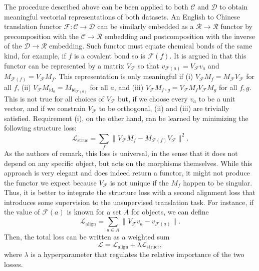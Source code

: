 \documentclass[11pt,a4paper,openright,twoside]{report}
\theoremstyle{plain}
\theoremstyle{definition}
\begin{document}
The procedure described above can be been applied to both $\mathcal{C}$ and $\mathcal{D}$ to obtain meaningful vectorial representations of both datasets. An English to Chinese translation functor $\mathcal{F}: \mathcal{C} \to \mathcal{D}$ can be similarly embedded as a $\mathcal{R} \to \mathcal{R}$ functor by precomposition with the $\mathcal{C} \to \mathcal{R}$ embedding and postcomposition with the inverse of the $\mathcal{D} \to \mathcal{R}$ embedding. Such functor must equate chemical bonds of the same kind, for example, if $f$ is a covalent bond so is $\mathcal{F}(f)$. It is argued in \cite{sheshmani2021categorical} that this functor can be represented by a matrix $V_\mathcal{F}$ so that $v_{\mathcal{F}(a)} =  V_\mathcal{F}v_a$ and $M_{\mathcal{F}(f)} = V_\mathcal{F}M_f$. This representation is only meaningful if (i) $V_{\mathcal{F}}M_f = M_{\mathcal{F}}V_{\mathcal{F}}$ for all $f$, (ii) $V_{\mathcal{F}}M_{\mathrm{id}_a} = M_{\mathrm{id}_{\mathcal{F}(a)}}$ for all $a$, and (iii) $V_{\mathcal{F}}M_{f \circ g} = V_{\mathcal{F}}M_fV_{\mathcal{F}}M_g$ for all $f,g$. This is not true for all choices of  $V_\mathcal{F}$ but, if we choose every $v_a$ to be a unit vector, and if we constrain $V_{\mathcal{F}}$ to be orthogonal, (ii) and (iii) are trivially satisfied. Requirement (i), on the other hand, can be learned by minimizing the following structure loss:
\[\mathcal{L}_{\mathrm{struc}} = \sum_{f}\|V_{\mathcal{F}}M_f - M_{\mathcal{F}(f)}V_{\mathcal{F}}\|^2.\]
As the authors of \cite{sheshmani2021categorical} remark, this loss is universal, in the sense that it does not depend on any specific object, but acts on the morphisms themselves. While this approach is very elegant and does indeed return a functor, it might not produce the functor we expect because $V_{\mathcal{F}}$ is not unique if the $M_f$ happen to be singular. Thus, it is better to integrate the structure loss with a second alignment loss that introduces some supervision to the unsupervised translation task. For instance, if the value of $\mathcal{F}(a)$ is known for a set $A$ for objects, we can define
\[\mathcal{L}_{\mathrm{align}} = \sum_{a \in A}\|V_{\mathcal{F}}v_a - v_{\mathcal{F}(a)}\|.\]
Then, the total loss can be written as a weighted sum 
\begin{equation}
  \label{eq: sumoflosses2}
  \mathcal{L} = \mathcal{L}_{\mathrm{align}} + \lambda \mathcal{L}_{\mathrm{struct}},
\end{equation}
where $\lambda$ is a hyperparameter that regulates the relative importance of the two losses.
\end{document}
